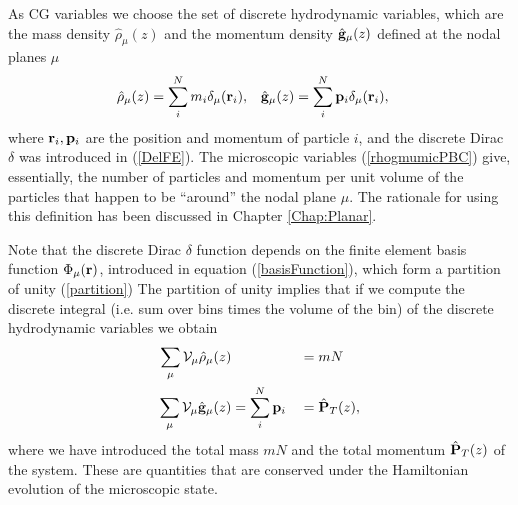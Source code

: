 \documentclass[b5paper,openright,10pt]{book}
\begin{document}
As CG variables we choose  the set of discrete hydrodynamic
variables,  which are  the  mass density  $\hat{\rho}_\mu(z)$ and  the
momentum  density $\hat{\bf  g}_\mu(z)$  defined at  the nodal  planes
$\mu$   
\begin{align}
  \hat{\rho}_\mu(z)&= \sum_i^Nm_i\delta_\mu({\bf r}_i),&
\hat{\bf g}_\mu(z)&= \sum_i^N{\bf p}_i\delta_\mu({\bf r}_i),
\label{rhogmumicPBC}
\end{align}
where ${\bf r}_i,{\bf p}_i$ are the position and momentum of particle $i$, and the discrete Dirac $\delta$ was introduced in (\ref{DelFE}).
The  microscopic  variables  (\ref{rhogmumicPBC})  give,
essentially, the number  of particles and momentum per  unit volume of
the particles that happen to be ``around'' the nodal plane $\mu$.  The rationale for using this definition has been discussed in Chapter \ref{Chap:Planar}.


Note that the discrete Dirac $\delta$ function depends on the finite  element basis  function $\Phi_\mu({\bf  r})$, introduced in equation (\ref{basisFunction}), which form a
partition of unity (\ref{partition})
The  partition  of unity  implies  that  if  we compute  the  discrete
integral  (i.e. sum  over bins  times the  volume of  the bin)  of the
discrete hydrodynamic variables we obtain
\begin{align}
  \sum_\mu{\cal V}_\mu\hat{\rho}_\mu(z)&  &&= mN
\nonumber\\
  \sum_\mu{\cal V}_\mu\hat{\bf g}_\mu(z)&=\sum_i^N{\bf p}_i&&= \hat{\bf P}_T(z),
\label{DiscCons}
\end{align}
where we  have introduced the total  mass $mN$ and the  total momentum
$\hat{\bf  P}_T(z)$ of  the  system.  These  are  quantities that  are
conserved under  the Hamiltonian  evolution of the  microscopic state.
\end{document}
